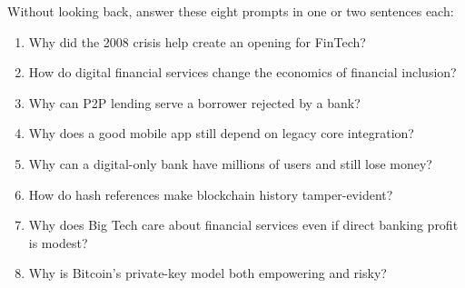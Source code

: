 \begin{quickcheck}
Without looking back, answer these eight prompts in one or two sentences each:
\begin{enumerate}
  \item Why did the 2008 crisis help create an opening for FinTech?
  \item How do digital financial services change the economics of financial inclusion?
  \item Why can P2P lending serve a borrower rejected by a bank?
  \item Why does a good mobile app still depend on legacy core integration?
  \item Why can a digital-only bank have millions of users and still lose money?
  \item How do hash references make blockchain history tamper-evident?
  \item Why does Big Tech care about financial services even if direct banking profit is modest?
  \item Why is Bitcoin's private-key model both empowering and risky?
\end{enumerate}
\end{quickcheck}
